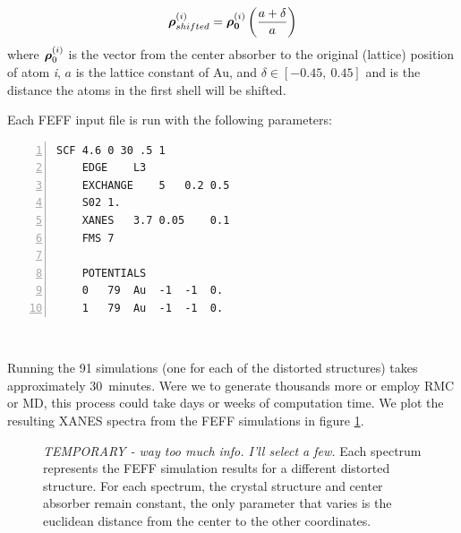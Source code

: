 \begin{equation}
	\label{eq:distortionator}
	\vb*{\rho}_{shifted}^{(i)} = \vb*{\rho_0}^{(i)} \left( \dfrac{a + \delta}{a} \right)
\end{equation}
where $ \vb*{\rho}_0^{(i)} $ is the vector from the center absorber to the original (lattice) position of atom \textit{i}, $ a $ is the lattice constant of Au, and $ \delta \in [-0.45,~0.45] $ and is the distance the atoms in the first shell will be shifted.   


\begin{minipage}{\linewidth}
Each FEFF input file is run with the following parameters: 
\begin{Verbatim}[samepage=true, numbers=left]
    SCF 4.6 0 30 .5 1
    EDGE    L3
    EXCHANGE    5   0.2 0.5
    S02 1.
    XANES   3.7 0.05    0.1
    FMS 7

    POTENTIALS
    0	79	Au	-1	-1	0.
    1	79	Au	-1	-1	0.
\end{Verbatim}
~
\end{minipage}

\noindent Running the 91 simulations (one for each of the distorted structures) takes approximately 30~minutes. Were we to generate thousands more or employ RMC or MD, this process could take days or weeks of computation time. We plot the resulting XANES spectra from the FEFF simulations in figure \ref{fig:feff-results}.

\begin{figure}[h]
	\centering
	\caption[FEFF Simulations Results]{\textit{TEMPORARY - way too much info. I'll select a few. }Each spectrum represents the FEFF simulation results for a different distorted structure. For each spectrum, the crystal structure and center absorber remain constant, the only parameter that varies is the euclidean distance from the center to the other coordinates.}
	\label{fig:feff-results}
\end{figure}

